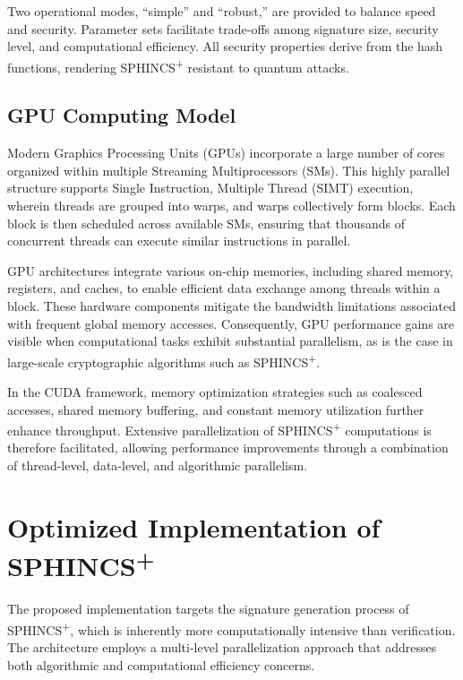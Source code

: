 \documentclass[journal]{IEEEtran}
\begin{document}
Two operational modes, “simple” and “robust,” are provided to balance speed and security. Parameter sets facilitate trade-offs among signature size, security level, and computational efficiency. All security properties derive from the hash functions, rendering SPHINCS\textsuperscript{+} resistant to quantum attacks.

\subsection{GPU Computing Model}

Modern Graphics Processing Units (GPUs) incorporate a large number of cores organized within multiple Streaming Multiprocessors (SMs). This highly parallel structure supports Single Instruction, Multiple Thread (SIMT) execution, wherein threads are grouped into warps, and warps collectively form blocks. Each block is then scheduled across available SMs, ensuring that thousands of concurrent threads can execute similar instructions in parallel.

GPU architectures integrate various on-chip memories, including shared memory, registers, and caches, to enable efficient data exchange among threads within a block. These hardware components mitigate the bandwidth limitations associated with frequent global memory accesses. Consequently, GPU performance gains are visible when computational tasks exhibit substantial parallelism, as is the case in large-scale cryptographic algorithms such as SPHINCS\textsuperscript{+}.

In the CUDA framework, memory optimization strategies such as coalesced accesses, shared memory buffering, and constant memory utilization further enhance throughput. Extensive parallelization of SPHINCS\textsuperscript{+} computations is therefore facilitated, allowing performance improvements through a combination of thread-level, data-level, and algorithmic parallelism.

\color{blue}

\section{Optimized Implementation of \texorpdfstring{SPHINCS\textsuperscript{+}}{SPHINCS+}}\label{sec:implementation}

The proposed implementation targets the signature generation process of SPHINCS\textsuperscript{+}, which is inherently more computationally intensive than verification. The architecture employs a multi-level parallelization approach that addresses both algorithmic and computational efficiency concerns.
\end{document}
